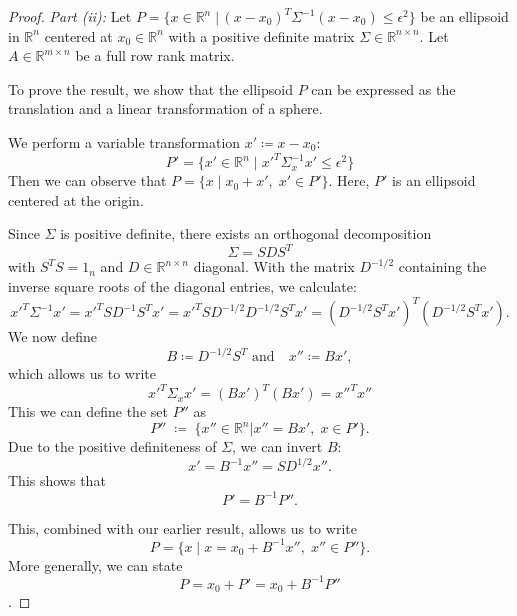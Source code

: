 \documentclass{article}
\begin{document}
\begin{proof}
	\emph{Part (ii):}
	Let $P=\{x \in \mathbb{R}^n \; \vert \, (x-x_0)^T \Sigma^{-1} (x-x_0) \leq \epsilon^2 \}$ be an ellipsoid in $\mathbb{R}^n$ centered at $x_0 \in \mathbb{R}^n$ with a positive definite matrix $\Sigma \in \mathbb{R}^{n \times n}$.
	Let $A \in \mathbb{R}^{m \times n}$ be a full row rank matrix.

	To prove the result, we show that the ellipsoid \(P\) can be expressed as the translation and a linear transformation of a sphere.
	
	We perform a variable transformation $x' \coloneqq x-x_0$:
	\begin{equation*}
		P' = \{x' \in \mathbb{R}^n \; \vert \; x'^T \Sigma_x^{-1}x' \leq \epsilon^2\}
	\end{equation*}
	Then we can observe that \(P = \{x \;\vert \; x_0 + x',\; x' \in P'\}\).
	Here, \(P'\) is an ellipsoid centered at the origin. 

	Since $\Sigma$ is positive definite, there exists an orthogonal decomposition
	\begin{equation*}
		\Sigma = S D S^T
	\end{equation*}
	with $S^T S = 1_n$ and $D \in \mathbb{R}^{n \times n}$ diagonal.
	With the matrix $D^{-1/2}$ containing the inverse square roots of the diagonal entries, we calculate:
	\begin{equation*}
		x'^T \Sigma^{-1} x' = x'^T S D^{-1} S^T x' = x'^T S D^{-1/2} D^{-1/2} S^T x' = (D^{-1/2} S^T x')^T (D^{-1/2} S^T x').
	\end{equation*}
	We now define
	\begin{equation*}
		B \coloneqq D^{-1/2} S^T \text{ and} \quad x'' \coloneqq Bx',
	\end{equation*}
	which allows us to write
	\begin{equation*}
		x'^T \Sigma_x x' = (Bx')^T(Bx') = x''^T x''
	\end{equation*}
	This  we can define the set \(P''\) as 
	\begin{equation*}
		P'' \; \coloneqq \; \{x'' \in \mathbb{R}^n \vert x'' = Bx', \; x \in P' \}.
	\end{equation*}
	Due to the positive definiteness of $\Sigma$, we can invert $B$:
	\begin{equation*}
		x' = B^{-1}x'' = S D^{1/2} x''.
	\end{equation*}
	This shows that 
	\[
	P' = B^{-1} P''.	
	\]

	This, combined with our earlier result, allows us to write 
	\[
	P = \{x \;\vert\; x = x_0 + B^{-1}x'',\; x'' \in P''\}.
	\] 
	More generally, we can state
	\[P = x_0 + P' = x_0 + B^{-1}P''\].


\end{proof}
\end{document}
